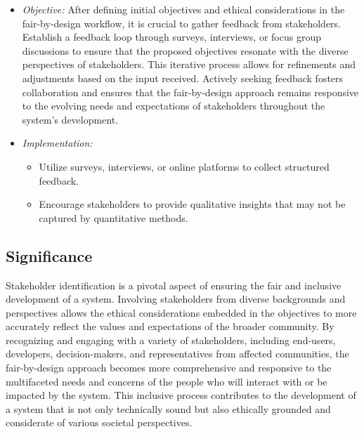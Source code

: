 \documentclass[12pt,a4paper,openright,twoside]{book}
\begin{document}
\begin{itemize}

    \item \emph{Objective:} After defining initial objectives and ethical considerations in the fair-by-design workflow, it is crucial to gather feedback from stakeholders. Establish a feedback loop through surveys, interviews, or focus group discussions to ensure that the proposed objectives resonate with the diverse perspectives of stakeholders. This iterative process allows for refinements and adjustments based on the input received. Actively seeking feedback fosters collaboration and ensures that the fair-by-design approach remains responsive to the evolving needs and expectations of stakeholders throughout the system's development.

    \item \emph{Implementation:}

    \begin{itemize}

        \item Utilize surveys, interviews, or online platforms to collect structured feedback.

        \item Encourage stakeholders to provide qualitative insights that may not be captured by quantitative methods.

    \end{itemize}

\end{itemize}

\subsection{Significance}

Stakeholder identification is a pivotal aspect of ensuring the fair and inclusive development of a system. Involving stakeholders from diverse backgrounds and perspectives allows the ethical considerations embedded in the objectives to more accurately reflect the values and expectations of the broader community. By recognizing and engaging with a variety of stakeholders, including end-users, developers, decision-makers, and representatives from affected communities, the fair-by-design approach becomes more comprehensive and responsive to the multifaceted needs and concerns of the people who will interact with or be impacted by the system. This inclusive process contributes to the development of a system that is not only technically sound but also ethically grounded and considerate of various societal perspectives.
\end{document}
